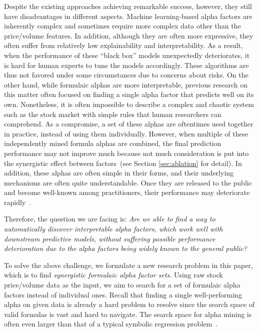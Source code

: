 Despite the existing approaches achieving remarkable success, however, they still have disadvantages in different aspects. 
Machine learning-based alpha factors are inherently complex and sometimes require more complex data other than the price/volume features.
In addition, although they are often more expressive, they often suffer from relatively low explainability and interpretability. 
As a result, when the performance of these ``black box'' models unexpectedly deteriorates, it is hard for human experts to tune the models accordingly.
These algorithms are thus not favored under some circumstances due to concerns about risks.
On the other hand, while formulaic alphas are more interpretable, previous research on this matter often focused on finding a single alpha factor that predicts well on its own. 
Nonetheless, it is often impossible to describe a complex and chaotic system such as the stock market with simple rules that human researchers can comprehend.
As a compromise, a set of these alphas are oftentimes used together in practice, instead of using them individually.
However, when multiple of these independently mined formula alphas are combined, the final prediction performance may not improve much because not much consideration is put into the synergistic effect between factors~(see Section \ref{sec:ablation} for detail). 
In addition, these alphas are often simple in their forms, and their underlying mechanisms are often quite understandable. 
Once they are released to the public and become well-known among practitioners, their performance may deteriorate rapidly~\cite{alpha101}. 

Therefore, the question we are facing is: \emph{Are we able to find a way to automatically discover interpretable alpha factors, which work well with downstream predictive models, without suffering possible performance deterioration due to the alpha factors being widely known to the general public?}

To solve the above challenge, we formulate a new research problem in this paper, which is to find \emph{synergistic formulaic alpha factor sets}. Using raw stock price/volume data as the input, we aim to search for a set of formulaic alpha factors instead of individual ones. 
Recall that finding a single well-performing alpha on given data is already a hard problem to resolve since the search space of valid formulas is vast and hard to navigate. 
The search space for alpha mining is often even larger than that of a typical symbolic regression problem~\cite{dsr}. 

